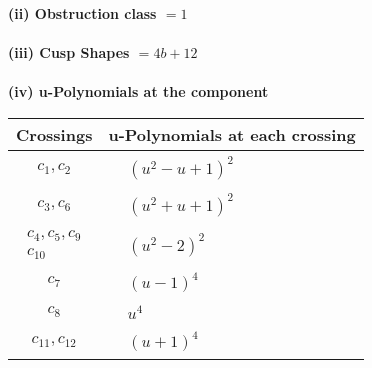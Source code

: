 \documentclass[1p]{elsarticle_modified}
\theoremstyle{definition}
\begin{document}
\flushleft \textbf{(ii) Obstruction class $= 1$}\\~\\
\flushleft \textbf{(iii) Cusp Shapes $= 4 b+12$}\\~\\
\newpage\renewcommand{\arraystretch}{1}
\flushleft \textbf{(iv) u-Polynomials at the component}\newline \\
\begin{tabular}{m{50pt}|m{274pt}}
Crossings & \hspace{64pt}u-Polynomials at each crossing \\
\hline $$\begin{aligned}c_{1},c_{2}\end{aligned}$$&$\begin{aligned}
&(u^2- u+1)^2
\end{aligned}$\\
\hline $$\begin{aligned}c_{3},c_{6}\end{aligned}$$&$\begin{aligned}
&(u^2+u+1)^2
\end{aligned}$\\
\hline $$\begin{aligned}c_{4},c_{5},c_{9}\\c_{10}\end{aligned}$$&$\begin{aligned}
&(u^2-2)^2
\end{aligned}$\\
\hline $$\begin{aligned}c_{7}\end{aligned}$$&$\begin{aligned}
&(u-1)^4
\end{aligned}$\\
\hline $$\begin{aligned}c_{8}\end{aligned}$$&$\begin{aligned}
&u^4
\end{aligned}$\\
\hline $$\begin{aligned}c_{11},c_{12}\end{aligned}$$&$\begin{aligned}
&(u+1)^4
\end{aligned}$\\
\hline
\end{tabular}\\~\\
\end{document}
